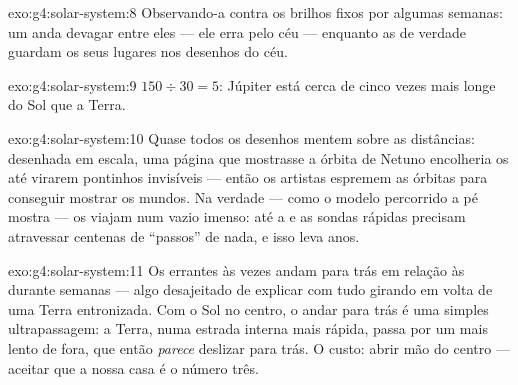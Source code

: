 \begin{solution}{exo:g4:solar-system:8}
Observando-a contra os brilhos fixos por algumas semanas: um 
anda devagar entre eles --- ele erra pelo céu --- enquanto as
 de verdade guardam os seus lugares nos desenhos do céu.
\end{solution}

\begin{solution}{exo:g4:solar-system:9}
$150 \div 30 = 5$: Júpiter está cerca de cinco vezes mais longe do
Sol que a Terra.
\end{solution}

\begin{solution}{exo:g4:solar-system:10}
Quase todos os desenhos mentem sobre as distâncias: desenhada em
escala, uma página que mostrasse a órbita de Netuno encolheria os
 até virarem pontinhos invisíveis --- então os artistas
espremem as órbitas para conseguir mostrar os mundos. Na verdade ---
como o modelo percorrido a pé mostra --- os  viajam num vazio
imenso: até a  e as sondas rápidas precisam atravessar centenas de
``passos'' de nada, e isso leva anos.
\end{solution}

\begin{solution}{exo:g4:solar-system:11}
Os errantes às vezes andam para trás em relação às  durante
semanas --- algo desajeitado de explicar com tudo girando em volta de
uma Terra entronizada. Com o Sol no centro, o andar para trás é uma
simples ultrapassagem: a Terra, numa estrada interna mais rápida,
passa por um  mais lento de fora, que então \emph{parece}
deslizar para trás. O custo: abrir mão do centro --- aceitar que a
nossa casa é o  número três.
\end{solution}
